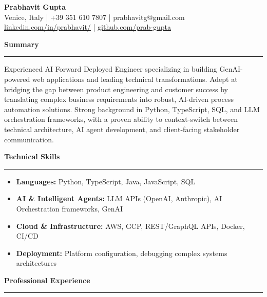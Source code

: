 \documentclass[11pt,a4paper]{article}
\begin{document}
\begin{center}
{\LARGE \textbf{Prabhavit Gupta}}\\
\vspace{0.5em}
Venice, Italy | +39 351 610 7807 | prabhavitg@gmail.com\\
\href{https://www.linkedin.com/in/prabhavit/}{linkedin.com/in/prabhavit/} | \href{https://github.com/prab-gupta}{github.com/prab-gupta}
\end{center}

\vspace{1em}

\noindent\textbf{\Large Summary}
\vspace{0.5em}\hrule\vspace{0.5em}
\noindent Experienced AI Forward Deployed Engineer specializing in building GenAI-powered web applications and leading technical transformations. Adept at bridging the gap between product engineering and customer success by translating complex business requirements into robust, AI-driven process automation solutions. Strong background in Python, TypeScript, SQL, and LLM orchestration frameworks, with a proven ability to context-switch between technical architecture, AI agent development, and client-facing stakeholder communication.

\vspace{1em}

\noindent\textbf{\Large Technical Skills}
\vspace{0.5em}\hrule\vspace{0.5em}
\begin{itemize}[leftmargin=*, nosep]
    \item \textbf{Languages:} Python, TypeScript, Java, JavaScript, SQL
    \item \textbf{AI \& Intelligent Agents:} LLM APIs (OpenAI, Anthropic), AI Orchestration frameworks, GenAI
    \item \textbf{Cloud \& Infrastructure:} AWS, GCP, REST/GraphQL APIs, Docker, CI/CD
    \item \textbf{Deployment:} Platform configuration, debugging complex systems architectures
\end{itemize}

\vspace{1em}

\noindent\textbf{\Large Professional Experience}
\vspace{0.5em}\hrule\vspace{0.5em}
\end{document}
